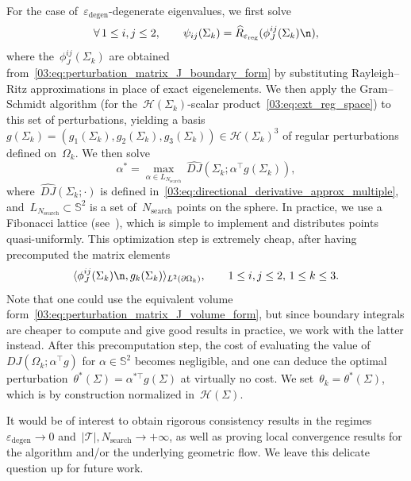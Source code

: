 For the case of~$\varepsilon_{\mathrm{degen}}$-degenerate eigenvalues, we first solve
\begin{equation}
    \label{03:eq:ascent_direction_multiple}
   \forall\,1\leq i,j\leq 2,\qquad\psi_{ij}(\Sigma_k) = \widehat{R}_{\varepsilon_{\mathrm{reg}}}(\phi_{J}^{ij}(\Sigma_k)\n),
\end{equation}
where the~$\phi_{J}^{ij}(\Sigma_k)$ are obtained from~\eqref{03:eq:perturbation_matrix_J_boundary_form} by substituting Rayleigh--Ritz approximations in place of exact eigenelements. We then apply the Gram--Schmidt algorithm (for the~$\mathcal H(\Sigma_k)$-scalar product~\eqref{03:eq:ext_reg_space}) to this set of perturbations, yielding a basis
$g(\Sigma_k)=(g_1(\Sigma_k),g_2(\Sigma_k),g_3(\Sigma_k))\in\mathcal H(\Sigma_k)^3$ of regular perturbations defined on~$\Omega_k$. We then solve
\begin{equation}
    \alpha^* = \underset{\alpha\in L_{N_{\mathrm{search}}}}{\max}\,\widehat{DJ}(\Sigma_k;\alpha^\top g(\Sigma_k)),
\end{equation}
where~$\widehat{DJ}(\Sigma_k;\cdot)$ is defined in~\eqref{03:eq:directional_derivative_approx_multiple}, and~$L_{N_{\mathrm{search}}}\subset\mathbb S^2$ is a set of~$N_{\mathrm{search}}$ points on the sphere. In practice, we use a Fibonacci lattice (see~\cite{G10}), which is simple to implement and distributes points quasi-uniformly.
This optimization step is extremely cheap, after having precomputed the matrix elements
\begin{equation}
    \langle\phi_{J}^{ij}(\Sigma_k)\n,g_k(\Sigma_k)\rangle_{L^2(\partial\Omega_k)},\qquad 1\leq i,j\leq 2,\,1\leq k\leq 3.
\end{equation}
Note that one could use the equivalent volume form~\eqref{03:eq:perturbation_matrix_J_volume_form}, but since boundary integrals are cheaper to compute and give good results in practice, we work with the latter instead.
After this precomputation step, the cost of evaluating the value of~$DJ(\Omega_k;\alpha^\top g)$ for $\alpha\in \mathbb S^2$ becomes negligible, and one can deduce the optimal perturbation~$\theta^*(\Sigma)=\alpha^{*\top}g(\Sigma)$ at virtually no cost.
We set~$\theta_k = \theta^*(\Sigma)$, which is by construction normalized in~$\mathcal H(\Sigma)$.

It would be of interest to obtain rigorous consistency results in the regimes~$\varepsilon_{\mathrm{degen}}\to 0$ and~$|\mathcal T|,N_{\mathrm{search}}\to+\infty$, as well as proving local convergence results for the algorithm and/or the underlying geometric flow. We leave this delicate question up for future work.

